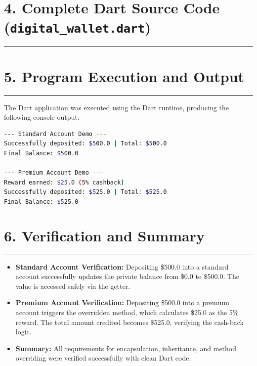 \documentclass[11pt,a4paper]{article}
\begin{document}
\newpage

\section*{4. Complete Dart Source Code (\texttt{digital\_wallet.dart})}
\noindent\rule{\textwidth}{0.5pt}\vspace{0.2cm}



\newpage

\section*{5. Program Execution and Output}
\noindent\rule{\textwidth}{0.5pt}\vspace{0.2cm}

The Dart application was executed using the Dart runtime, producing the following console output:

\vspace{0.2cm}
\begin{lstlisting}[language=bash, basicstyle=\ttfamily\small, frame=single, backgroundcolor=\color{black!5}]
--- Standard Account Demo ---
Successfully deposited: $500.0 | Total: $500.0
Final Balance: $500.0

--- Premium Account Demo ---
Reward earned: $25.0 (5% cashback)
Successfully deposited: $525.0 | Total: $525.0
Final Balance: $525.0
\end{lstlisting}

\vspace{0.4cm}
\section*{6. Verification and Summary}
\noindent\rule{\textwidth}{0.5pt}\vspace{0.15cm}

\begin{itemize}
    \setlength{\itemsep}{5pt}
    \item \textbf{Standard Account Verification:} Depositing \$500.0 into a standard account successfully updates the private balance from \$0.0 to \$500.0. The value is accessed safely via the getter.
    \item \textbf{Premium Account Verification:} Depositing \$500.0 into a premium account triggers the overridden method, which calculates \$25.0 as the 5\% reward. The total amount credited becomes \$525.0, verifying the cash-back logic.
    \item \textbf{Summary:} All requirements for encapsulation, inheritance, and method overriding were verified successfully with clean Dart code.
\end{itemize}
\end{document}
